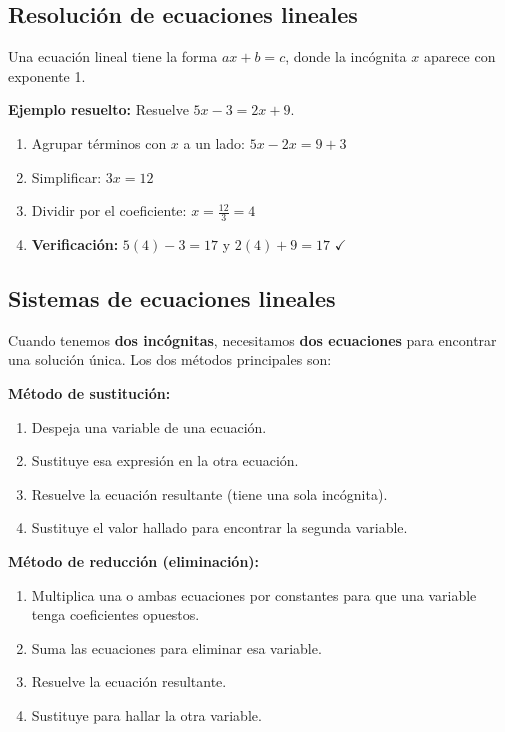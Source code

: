 \documentclass[12pt, letterpaper]{article}
\begin{document}
\subsection{Resolución de ecuaciones lineales}

Una ecuación lineal tiene la forma $ax + b = c$, donde la incógnita $x$ aparece con exponente 1.

\noindent\textbf{Ejemplo resuelto:} Resuelve $5x - 3 = 2x + 9$.
\begin{enumerate}
  \item Agrupar términos con $x$ a un lado: $5x - 2x = 9 + 3$
  \item Simplificar: $3x = 12$
  \item Dividir por el coeficiente: $x = \frac{12}{3} = 4$
  \item \textbf{Verificación:} $5(4) - 3 = 17$ y $2(4) + 9 = 17$ $\checkmark$
\end{enumerate}

\newpage

\subsection{Sistemas de ecuaciones lineales}

Cuando tenemos \textbf{dos incógnitas}, necesitamos \textbf{dos ecuaciones} para encontrar una solución única. Los dos métodos principales son:

\begin{cuadrosolucion}
  \textbf{Método de sustitución:}
  \begin{enumerate}[leftmargin=*]
    \item Despeja una variable de una ecuación.
    \item Sustituye esa expresión en la otra ecuación.
    \item Resuelve la ecuación resultante (tiene una sola incógnita).
    \item Sustituye el valor hallado para encontrar la segunda variable.
  \end{enumerate}
\end{cuadrosolucion}

\begin{cuadroextra}
  \textbf{Método de reducción (eliminación):}
  \begin{enumerate}[leftmargin=*]
    \item Multiplica una o ambas ecuaciones por constantes para que una variable tenga coeficientes opuestos.
    \item Suma las ecuaciones para eliminar esa variable.
    \item Resuelve la ecuación resultante.
    \item Sustituye para hallar la otra variable.
  \end{enumerate}
\end{cuadroextra}
\end{document}
